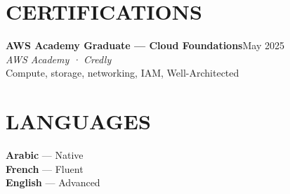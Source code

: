 \documentclass[10pt,a4paper]{article}
\newcommand{\cert}[4]{%
  \textbf{\color{primary}\small #1}\hfill{\color{muted}\scriptsize #3}\\[-1pt]
  {\color{accent}\small\textit{#2}}\\[0pt]
  {\color{muted}\scriptsize #4}\\[2pt]
}
\begin{document}
\vspace{1pt}
\begin{minipage}[t]{0.68\textwidth}
\section{CERTIFICATIONS}
\cert{AWS Academy Graduate — Cloud Foundations}{AWS Academy · Credly}{May 2025}{Compute, storage, networking, IAM, Well-Architected}
\end{minipage}%
\hfill
\begin{minipage}[t]{0.28\textwidth}
\section{LANGUAGES}
{\small\textbf{Arabic} — Native}\\[1pt]
{\small\textbf{French} — Fluent}\\[1pt]
{\small\textbf{English} — Advanced}
\end{minipage}
\end{document}
